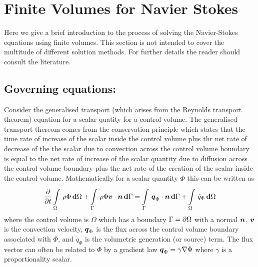 \section{Finite Volumes for Navier Stokes}

Here we give a brief introduction to the process of solving the Navier-Stokes
equations using finite volumes. This section is not intended to cover the
multitude of different solution methods. For further details the reader should
consult the literature.

\subsection{Governing equations:}

Consider the generalised transport (which arises from the Reynolds transport
theorem) equation for a scalar quatity for a control volume. The generalised
transport thereom comes from the conservation principle which states that the
time rate of increase of the scalar inside the control volume plus thr net rate
of decrease of the the scalar due to convection across the control volume
boundary is equal to the net rate of increase of the scalar quantity due to
diffusion across the control volume boundary plus the net rate of the creation
of the scalar inside the control volume. Mathematically for a scalar quantity
$\Phi$ this can be written as
\begin{equation}
  \delby{}{t}\gint{\Omega}{}{\rho\Phi}{\Omega}+\gint{\Gamma}{}{\dotprod{\rho\Phi\vectr{v}}{\vectr{n}}}{\Gamma}=\gint{\Gamma}{}{\dotprod{\vectr{q}_{\Phi}}{\vectr{n}}}{\Gamma}+\gint{\Omega}{}{\dot{q}_{\Phi}}{\Omega}
  \label{eqn:integralgenscalartransport}
\end{equation}
where the control volume is $\Omega$ which has a boundary
$\Gamma= \partial{\Omega} $ with a normal $\boldsymbol{n}$, $\boldsymbol{v}$ is the
convection velocity, $\boldsymbol{q}_{\Phi}$ is the flux across the control volume
boundary associated with $\Phi$, and $\dot{q}_{\Phi}$ is the volumetric
generation (or source) term. The flux vector can often be related to $\Phi$ by
a gradient law \ie $\vectr{q}_{\Phi}=\gamma\gradient{}{\Phi}$ where $\gamma$
is a proportionality scalar. 

